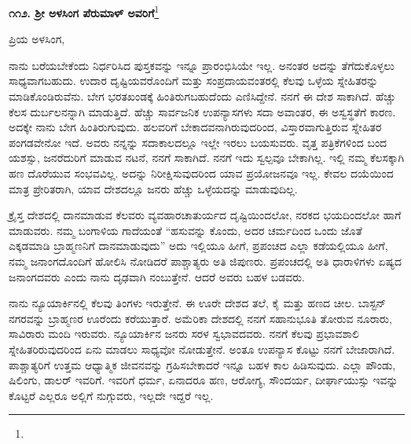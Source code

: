 \begin{center}
\textbf{೧೧೨. ಶ‍್ರೀ ಅಳಸಿಂಗ ಪೆರುಮಾಳ್ ಅವರಿಗೆ}\footnote{}
\end{center}

\vspace{-0.7cm}

\begin{flushright}
{\fontsize{12.5pt}{13pt}\selectfont{ಅಮೆರಿಕಾ\\೨೧ನೇ ಸೆಪ್ಟೆಂಬರ್, ೧೮೯೪}}
\end{flushright}

\vspace{-0.5cm}

\noindent
	ಪ್ರಿಯ ಅಳಸಿಂಗ,

{\fontsize{12.5pt}{13pt}\selectfont{ನಾನು ಬಿಡುವಿಲ್ಲದೆ ಊರಿನಿಂದ ಊರಿಗೆ ಅಲೆಯುತ್ತಾ ಪಾಠಪ್ರವಚನ, ಉಪನ್ಯಾಸಗಳಲ್ಲಿ ನಿರತನಾಗಿರುವೆನು.}}

\newpage

ನಾನು ಬರೆಯಬೇಕೆಂದು ನಿರ್ಧರಿಸಿದ ಪುಸ್ತಕವನ್ನು ಇನ್ನೂ ಪ್ರಾರಂಭಿಸಿಯೇ ಇಲ್ಲ. ಅನಂತರ ಅದನ್ನು ತೆಗೆದುಕೊಳ್ಳಲು ಸಾಧ್ಯವಾಗಬಹುದು. ಉದಾರ ದೃಷ್ಟಿಯವರೊಂದಿಗೆ ಮತ್ತು ಸಂಪ್ರದಾಯವಂತರಲ್ಲಿ ಕೆಲವು ಒಳ್ಳೆಯ ಸ್ನೇಹಿತರನ್ನು ಮಾಡಿಕೊಂಡಿರುವೆನು. ಬೇಗ ಭರತಖಂಡಕ್ಕೆ ಹಿಂತಿರುಗಬಹುದೆಂದು ಎಣಿಸಿದ್ದೇನೆ. ನನಗೆ ಈ ದೇಶ ಸಾಕಾಗಿದೆ. ಹೆಚ್ಚು ಕೆಲಸ ದುರ್ಬಲನನ್ನಾಗಿ ಮಾಡುತ್ತಿದೆ. ಹೆಚ್ಚು ಸಾರ್ವಜನಿಕ ಉಪನ್ಯಾಸಗಳು ಸದಾ ಅವಾಂತರ, ಈ ಅಸ್ವಸ್ಥತೆಗೆ ಕಾರಣ. ಅದಕ್ಕೇ ನಾನು ಬೇಗ ಹಿಂತಿರುಗುವುದು. ಹಲವರಿಗೆ ಬೇಕಾದವನಾಗಿರುವುದರಿಂದ, ವಿಸ್ತಾರವಾಗುತ್ತಿರುವ ಸ್ನೇಹಿತರ ಪಂಗಡವೇನೋ ಇದೆ. ಅವರು ನನ್ನನ್ನು ಸದಾಕಾಲದಲ್ಲೂ ಇಲ್ಲೇ ಇರಲು ಬಯಸುವರು. ವೃತ್ತ ಪತ್ರಿಕೆಗಳಿಂದ ಬಂದ ಯಶಸ್ಸು, ಜನರೆದುರಿಗೆ ಮಾಡುವ ನಟನೆ, ನನಗೆ ಸಾಕಾಗಿದೆ. ನನಗೆ ಇದು ಸ್ವಲ್ಪವೂ ಬೇಕಾಗಿಲ್ಲ. ಇಲ್ಲಿ ನಮ್ಮ ಕೆಲಸಕ್ಕಾಗಿ ಹಣ ದೊರೆಯುವ ಸಂಭವವಿಲ್ಲ. ಅದನ್ನು ನಿರೀಕ್ಷಿಸುವುದರಿಂದ ಯಾವ ಪ್ರಯೋಜನವೂ ಇಲ್ಲ. ಕೇವಲ ದಯೆಯಿಂದ ಮಾತ್ರ ಪ್ರೇರಿತರಾಗಿ, ಯಾವ ದೇಶದಲ್ಲೂ ಜನರು ಹೆಚ್ಚು ಒಳ್ಳೆಯದನ್ನು ಮಾಡುವುದಿಲ್ಲ.

ಕ್ರೈಸ್ತ ದೇಶದಲ್ಲಿ ದಾನಮಾಡುವ ಕೆಲವರು ವ್ಯವಹಾರಚಾತುರ್ಯದ ದೃಷ್ಟಿ\break ಯಿಂದಲೋ, ನರಕದ ಭಯದಿಂದಲೋ ಹಾಗೆ ಮಾಡುವರು. ನಮ್ಮ ಬಂಗಾಳಿಯ ಗಾದೆಯಂತೆ \enginline{-} “ಹಸುವನ್ನು ಕೊಂದು, ಅದರ ಚರ್ಮದಿಂದ ಒಂದು ಜೊತೆ ಎಕ್ಕಡಮಾಡಿ ಬ್ರಾಹ್ಮಣನಿಗೆ ದಾನಮಾಡುವುದು” \enginline{-} ಅದು ಇಲ್ಲಿಯೂ ಹೀಗೆ, ಪ್ರಪಂಚದ ಎಲ್ಲಾ ಕಡೆಯಲ್ಲಿಯೂ ಹೀಗೆ, ನಮ್ಮ ಜನಾಂಗದೊಂದಿಗೆ ಹೋಲಿಸಿ ನೋಡಿದರೆ ಪಾಶ್ಚಾತ್ಯರು ಅತಿ ಜಿಪುಣರು. ಪ್ರಪಂಚದಲ್ಲಿ ಅತಿ ಧಾರಾಳಿಗಳು ಏಷ್ಯದ ಜನಾಂಗದವರು ಎಂದು ನಾನು ದೃಢವಾಗಿ ನಂಬುತ್ತೇನೆ. ಆದರೆ ಅವರು ಬಹಳ ಬಡವರು.

ನಾನು ನ್ಯೂಯಾರ್ಕಿನಲ್ಲಿ ಕೆಲವು ತಿಂಗಳು ಇರುತ್ತೇನೆ. ಈ ಊರೇ ದೇಶದ ತಲೆ, ಕೈ ಮತ್ತು ಹಣದ ಚೀಲ. ಬಾಸ್ಟನ್ ನಗರವನ್ನು ಬ್ರಾಹ್ಮಣರ ಊರೆಂದು ಕರೆಯುತ್ತಾರೆ. ಅಮೆರಿಕಾ ದೇಶದಲ್ಲಿ ನನಗೆ ಸಹಾನುಭೂತಿ ತೋರುವ ನೂರಾರು, ಸಾವಿರಾರು ಮಂದಿ ಇರುವರು. ನ್ಯೂಯಾರ್ಕಿನ ಜನರು ಸರಳ ಸ್ವಭಾವದವರು. ನನಗೆ ಕೆಲವು ಪ್ರಭಾವಶಾಲಿ ಸ್ನೇಹಿತರಿರುವುದರಿಂದ ಏನು ಮಾಡಲು ಸಾಧ್ಯವೋ ನೋಡುತ್ತೇನೆ. ಅಂತೂ ಉಪನ್ಯಾಸ ಕೊಟ್ಟು ನನಗೆ ಬೇಜಾರಾಗಿದೆ. ಪಾಶ್ಚಾತ್ಯರಿಗೆ ಉತ್ತಮ ಆಧ್ಯಾತ್ಮಿಕ ಜೀವನವನ್ನು ಗ್ರಹಿಸಬೇಕಾದರೆ ಇನ್ನೂ ಬಹಳ ಕಾಲ ಹಿಡಿಸುವುದು. ಎಲ್ಲಾ ಪೌಂಡು, ಷಿಲಿಂಗು, ಡಾಲರ್ ಇವರಿಗೆ. ಇವರಿಗೆ ಧರ್ಮ, ಏನಾದರೂ ಹಣ, ಆರೋಗ್ಯ, ಸೌಂದರ್ಯ, ದೀರ್ಘಾಯುಸ್ಸು ಇವನ್ನು ಕೊಟ್ಟರೆ ಎಲ್ಲರೂ ಅಲ್ಲಿಗೆ ನುಗ್ಗುವರು, ಇಲ್ಲದೇ ಇದ್ದರೆ ಇಲ್ಲ.


